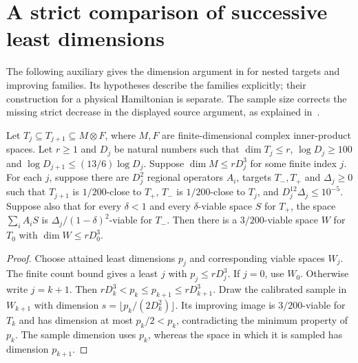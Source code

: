 \section{A strict comparison of successive least dimensions}

The following auxiliary gives the dimension argument in
\cite[Proposition~prop:albootstrap-ld, lines 1112--1128]{Arad2016RigorousRG}
for nested targets and improving families. Its hypotheses describe the
families explicitly; their construction for a physical Hamiltonian is
separate. The sample size corrects the missing strict decrease in the
displayed source argument, as explained
in~\cite{gap:alvv16_low_density_sampling}.

\begin{theorem}
    \label{thm:viable_dyadic_minimum_bound}
    \leanok
    Let $T_j\subseteq T_{j+1}\subseteq M\otimes F$, where $M,F$ are
    finite-dimensional complex inner-product spaces. Let $r\ge1$ and
    $D_j$ be natural numbers such that $\dim T_j\le r$,
    $\log D_j\ge100$ and
    $\log D_{j+1}\le(13/6)\log D_j$.
    Suppose $\dim M\le rD_j^3$ for some finite index $j$.
    For each $j$, suppose there are $D_j^2$ regional operators $A_i$,
    targets $T_-,T_+$ and $\Delta_j\ge0$ such that $T_{j+1}$ is
    $1/200$-close to $T_+$, $T_-$ is $1/200$-close to $T_j$, and
    $D_j^{12}\Delta_j\le10^{-5}$. Suppose also that for every
    $\delta<1$ and every $\delta$-viable space $S$ for $T_+$,
    the space $\sum_i A_iS$ is
    $\Delta_j/(1-\delta)^2$-viable for $T_-$.
    Then there is a $3/200$-viable space $W$ for $T_0$ with
    $\dim W\le rD_0^3$.
\end{theorem}
\begin{proof}
    \leanok
    Choose attained least dimensions $p_j$ and corresponding viable
    spaces $W_j$. The finite count bound gives a least $j$ with
    $p_j\le rD_j^3$. If $j=0$, use $W_0$.
    Otherwise write $j=k+1$. Then
    $rD_k^3<p_k\le p_{k+1}\le rD_{k+1}^3$.
    Draw the calibrated sample in $W_{k+1}$ with dimension
    $s=\lfloor p_k/(2D_k^2)\rfloor$.
    Its improving image is $3/200$-viable for $T_k$ and has dimension
    at most $p_k/2<p_k$, contradicting the minimum property of $p_k$.
    The sample dimension uses $p_k$, whereas the space in which it is
    sampled has dimension $p_{k+1}$.
\end{proof}

